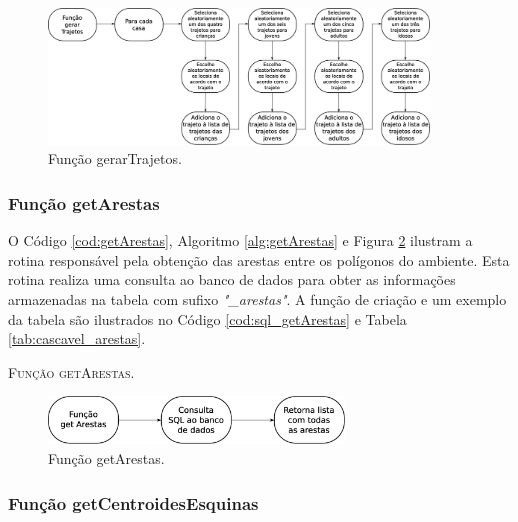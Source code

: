 \begin{figure}[H]
  \centering
  \includegraphics[width=0.9\textwidth]{Figuras/Simula/Fluxos/gerarTrajetos.eps}
  \caption{Função gerarTrajetos.}
  \label{fig:gerarTrajetos}
\end{figure} 

\newpage

\subsubsection{Função getArestas}

O Código \ref{cod:getArestas}, Algoritmo \ref{alg:getArestas} e Figura \ref{fig:getArestas} ilustram a rotina responsável pela obtenção das arestas entre os polígonos do ambiente. Esta rotina realiza uma consulta ao banco de dados para obter as informações armazenadas na tabela com sufixo \textit{"\_arestas"}. A função de criação e um exemplo da tabela são ilustrados no Código \ref{cod:sql_getArestas} e Tabela \ref{tab:cascavel_arestas}.  



\begin{algorithm}[H]
   \SetAlgoLined   
   
   \caption{\textsc{Função getArestas.}}
   \label{alg:getArestas}
\end{algorithm}

\begin{figure}[H]
  \centering
  \includegraphics[width=0.7\textwidth]{Figuras/Simula/Fluxos/getArestas.eps}
  \caption{Função getArestas.}
  \label{fig:getArestas}
\end{figure} 

\newpage

\subsubsection{Função getCentroidesEsquinas}

